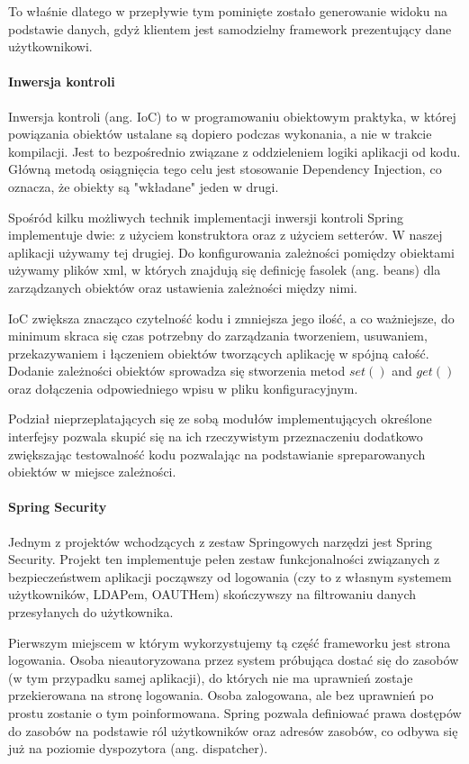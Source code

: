 \documentclass[licencjacka]{pracamgr}
\begin{document}
To właśnie dlatego w przepływie tym pominięte zostało generowanie widoku na podstawie danych, gdyż klientem jest samodzielny framework prezentujący dane użytkownikowi.

\paragraph{Inwersja kontroli}
Inwersja kontroli (ang. IoC) to w programowaniu obiektowym praktyka, w której powiązania obiektów ustalane są dopiero podczas wykonania, a nie w trakcie kompilacji. Jest to bezpośrednio związane z oddzieleniem logiki aplikacji od kodu. Główną metodą osiągnięcia tego celu jest stosowanie Dependency Injection, co oznacza, że obiekty są "wkładane" jeden w drugi.

Spośród kilku możliwych technik implementacji inwersji kontroli Spring implementuje dwie: z użyciem konstruktora oraz z użyciem setterów. W naszej aplikacji używamy tej drugiej. Do konfigurowania zależności pomiędzy obiektami używamy plików xml, w których znajdują się definicję fasolek (ang. beans) dla zarządzanych obiektów oraz ustawienia zależności między nimi.

IoC zwiększa znacząco czytelność kodu i zmniejsza jego ilość, a co ważniejsze, do minimum skraca się czas potrzebny do zarządzania tworzeniem, usuwaniem, przekazywaniem i łączeniem obiektów tworzących aplikację w spójną całość. Dodanie zależności obiektów sprowadza się stworzenia metod $set()$ and $get()$ oraz dołączenia odpowiedniego wpisu w pliku konfiguracyjnym.

Podział nieprzeplatających się ze sobą modułów implementujących określone interfejsy pozwala skupić się na ich rzeczywistym przeznaczeniu dodatkowo zwiększając testowalność kodu pozwalając na podstawianie spreparowanych obiektów w miejsce zależności.

\paragraph{Spring Security}
Jednym z projektów wchodzących z zestaw Springowych narzędzi jest Spring Security. Projekt ten implementuje pełen zestaw funkcjonalności związanych z bezpieczeństwem aplikacji począwszy od logowania (czy to z własnym systemem użytkowników, LDAPem, OAUTHem) skończywszy na filtrowaniu danych przesyłanych do użytkownika.

Pierwszym miejscem w którym wykorzystujemy tą część frameworku jest strona logowania. Osoba nieautoryzowana przez system próbująca dostać się do zasobów (w tym przypadku samej aplikacji), do których nie ma uprawnień zostaje przekierowana na stronę logowania. Osoba zalogowana, ale bez uprawnień po prostu zostanie o tym poinformowana. Spring pozwala definiować prawa dostępów do zasobów na podstawie ról użytkowników oraz adresów zasobów, co odbywa się już na poziomie dyspozytora (ang. dispatcher).
\end{document}
